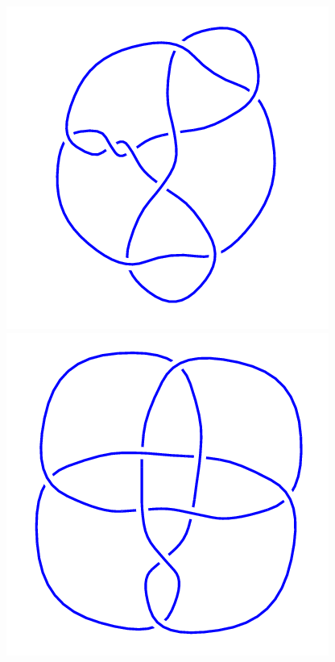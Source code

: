 \begin{figure}[H]
    \begin{minipage}[b]{.18\linewidth}
        \centering
        \includegraphics[width=\linewidth]{../data/9_46.png}
    \end{minipage}
    \begin{minipage}[b]{.18\linewidth}
        \centering
        \includegraphics[width=\linewidth]{../data/9_47.png}

\end{minipage}
\end{figure}
